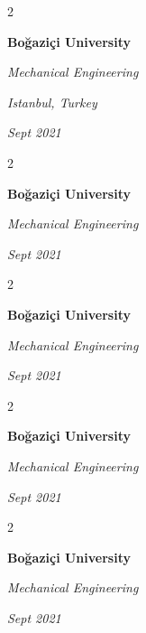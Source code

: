 \documentclass[10pt, letterpaper]{article}
\newenvironment{twocolentry}[2][]{
    \onecolentry
    \def\secondColumn{#2}
    \setcolumnwidth{\fill, 4.5 cm}
    \begin{paracol}{2}
}{
    \switchcolumn \raggedleft \secondColumn
    \end{paracol}
    \endonecolentry
} %
\begin{document}
        \vspace{0.2 cm}

        \begin{twocolentry}{
        \textit{Istanbul, Turkey}    
            
        \textit{Sept 2021}}
            \textbf{Boğaziçi University}

            \textit{Mechanical Engineering}
        \end{twocolentry}



        \vspace{0.2 cm}

        \begin{twocolentry}{
            
            
        \textit{Sept 2021}}
            \textbf{Boğaziçi University}

            \textit{Mechanical Engineering}
        \end{twocolentry}



        \vspace{0.2 cm}

        \begin{twocolentry}{
            
            
        \textit{Sept 2021}}
            \textbf{Boğaziçi University}

            \textit{Mechanical Engineering}
        \end{twocolentry}



        \vspace{0.2 cm}

        \begin{twocolentry}{
            
            
        \textit{Sept 2021}}
            \textbf{Boğaziçi University}

            \textit{Mechanical Engineering}
        \end{twocolentry}



        \vspace{0.2 cm}

        \begin{twocolentry}{
            
            
        \textit{Sept 2021}}
            \textbf{Boğaziçi University}

            \textit{Mechanical Engineering}
        \end{twocolentry}
\end{document}
